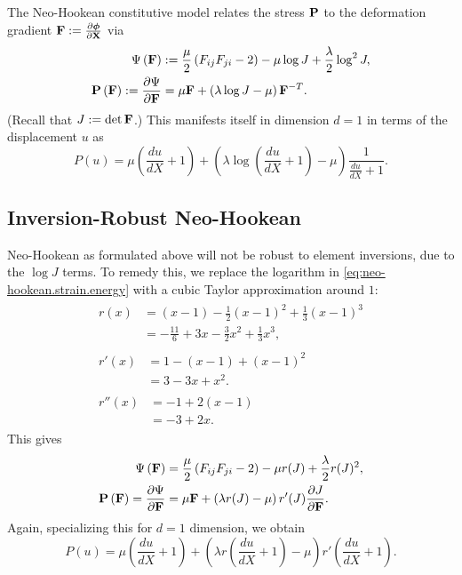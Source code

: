The Neo-Hookean constitutive model relates the stress $\mathbf{P}$ to the deformation gradient $\mathbf{F} := \frac{\partial\boldsymbol{\phi}}{\partial\mathbf{X}}$ via
\begin{subequations}
\begin{align}
\Psi \left( \mathbf{F} \right) & := \frac{\mu}{2} \left( F_{ij} F_{ji} - 2 \right) - \mu \log J + \frac{\lambda}{2} \log^2 J, \label{eq:neo-hookean.strain.energy} \\
\mathbf{P} \left( \mathbf{F} \right) := \frac{\partial \Psi}{\partial \mathbf{F}} & = \mu \mathbf{F} + \left( \lambda \log J - \mu \right) \mathbf{F}^{-T}.
\end{align}
\end{subequations}
(Recall that $J := \det \mathbf{F}$.) This manifests itself in dimension $d = 1$ in terms of the displacement $u$ as
\begin{equation*}
P(u) = \mu \left( \frac{du}{dX} + 1 \right) + \left( \lambda \log \left( \frac{du}{dX} + 1 \right) - \mu \right) \frac{1}{\frac{du}{dX} + 1}.
\end{equation*}

\subsection{Inversion-Robust Neo-Hookean}

Neo-Hookean as formulated above will not be robust to element inversions, due to the $\log J$ terms. To remedy this, we replace the logarithm in \eqref{eq:neo-hookean.strain.energy} with a cubic Taylor approximation around $1$:
\begin{subequations}\label{eq:r}
\begin{align}
\begin{split}
r(x) & = (x - 1) - \frac{1}{2} (x - 1)^2 + \frac{1}{3} (x - 1)^3 \\
     & = -\frac{11}{6} + 3 x - \frac{3}{2} x^2 + \frac{1}{3} x^3,
\end{split} \\
\begin{split}
r'(x) & = 1 - (x - 1) + (x - 1)^2 \\
      & = 3 - 3 x + x^2.
\end{split} \\
\begin{split}
r''(x) & = -1 + 2 (x - 1) \\
       & = -3 + 2 x.
\end{split}
\end{align}
\end{subequations}
This gives
\begin{align*}
\Psi \left( \mathbf{F} \right) & = \frac{\mu}{2} \left( F_{ij} F_{ji} - 2 \right) - \mu r(J) + \frac{\lambda}{2} r(J)^2, \\ \mathbf{P} \left( \mathbf{F} \right) = \frac{\partial \Psi}{\partial \mathbf{F}} & = \mu \mathbf{F} + \left( \lambda r(J) - \mu \right) r'(J) \frac{\partial J}{\partial \mathbf{F}}.
\end{align*}
Again, specializing this for $d = 1$ dimension, we obtain
\begin{equation}\label{eq:P.1d}
P(u) = \mu \left( \frac{du}{dX} + 1 \right) + \left( \lambda r \left( \frac{du}{dX} + 1 \right) - \mu \right) r' \left( \frac{du}{dX} + 1 \right).
\end{equation}

